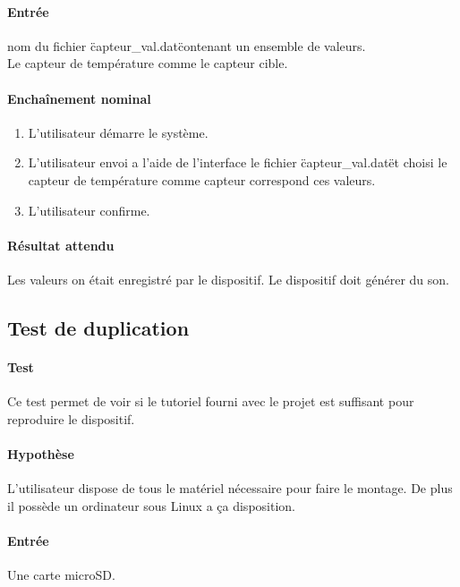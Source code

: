 \documentclass[a4paper, titlepage, oneside, 12pt]{article}%
\begin{document}
\paragraph{Entrée\\}
nom du fichier \"capteur\_val.dat\" contenant un ensemble de valeurs.\\
Le capteur de température comme le capteur cible.


\paragraph{Enchaînement nominal}
\begin {enumerate}
\item L'utilisateur démarre le système.
\item L'utilisateur envoi a l'aide de l'interface le fichier \"capteur\_val.dat\" et choisi le capteur de température comme capteur correspond ces valeurs.
\item L'utilisateur confirme.
\end{enumerate}

\paragraph{Résultat attendu\\}
Les valeurs on était enregistré par le dispositif. Le dispositif doit générer du son.


\subsection{Test de duplication}

\paragraph{Test\\}
Ce test permet de voir si le tutoriel fourni avec le projet est suffisant pour reproduire le dispositif.
\paragraph{Hypothèse\\}
L'utilisateur dispose de tous le matériel nécessaire pour faire le montage.
De plus il possède un ordinateur sous Linux a ça disposition.

\paragraph{Entrée\\}
Une carte microSD.
\end{document}
